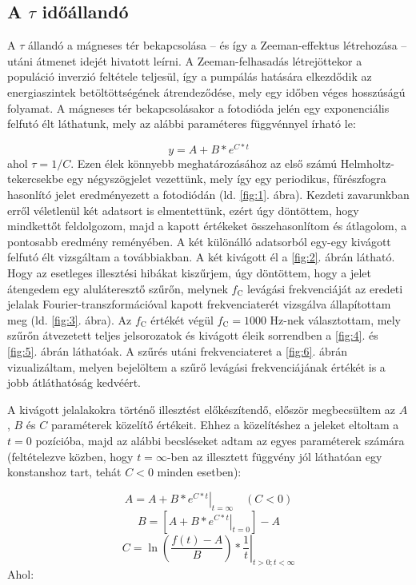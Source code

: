 \begin{multicols}{2}
\subsection{A $\tau$ időállandó}
A $\tau$ állandó a mágneses tér bekapcsolása -- és így a Zeeman-effektus létrehozása -- utáni átmenet idejét hivatott leírni. A Zeeman-felhasadás létrejöttekor a populáció inverzió feltétele teljesül, így a pumpálás hatására elkezdődik az energiaszintek betöltöttségének átrendeződése, mely egy időben véges hosszúságú folyamat. A mágneses tér bekapcsolásakor a fotodióda jelén egy exponenciális felfutó élt láthatunk, mely az alábbi paraméteres függvénnyel írható le:

\begin{equation} \label{eq:2}
y
=
A + B * e^{C * t}
\end{equation}
ahol $\tau = 1/C$. Ezen élek könnyebb meghatározásához az első számú Helmholtz-tekercsekbe egy négyszögjelet vezettünk, mely így egy periodikus, fűrészfogra hasonlító jelet eredményezett a fotodiódán (ld. \ref{fig:1}. ábra). Kezdeti zavarunkban erről véletlenül két adatsort is elmentettünk, ezért úgy döntöttem, hogy mindkettőt feldolgozom, majd a kapott értékeket összehasonlítom és átlagolom, a pontosabb eredmény reményében. \newline
A két különálló adatsorból egy-egy kivágott felfutó élt vizsgáltam a továbbiakban. A két kivágott él a \ref{fig:2}. ábrán látható. Hogy az esetleges illesztési hibákat kiszűrjem, úgy döntöttem, hogy a jelet átengedem egy aluláteresztő szűrőn, melynek $f_{\text{C}}$ levágási frekvenciáját az eredeti jelalak Fourier-transzformációval kapott frekvenciaterét vizsgálva állapítottam meg (ld. \ref{fig:3}. ábra). Az $f_{\text{C}}$ értékét végül $f_{\text{C}} = 1000$ Hz-nek választottam, mely szűrőn átvezetett teljes jelsorozatok és kivágott éleik sorrendben a \ref{fig:4}. és \ref{fig:5}. ábrán láthatóak. A szűrés utáni frekvenciateret a \ref{fig:6}. ábrán vizualizáltam, melyen bejelöltem a szűrő levágási frekvenciájának értékét is a jobb átláthatóság kedvéért. \par
A kivágott jelalakokra történő illesztést előkészítendő, először megbecsültem az $A$, $B$ és $C$ paraméterek közelítő értékeit. Ehhez a közelítéshez a jeleket eltoltam a $t = 0$ pozícióba, majd az alábbi becsléseket adtam az egyes paraméterek számára (feltételezve közben, hogy $t = \infty$-ben az illesztett függvény jól láthatóan egy konstanshoz tart, tehát $C < 0$ minden esetben):

\begin{equation*}
A
=
\left. A + B * e^{C * t} \right|_{t = \infty} \quad (C < 0)
\end{equation*}
\begin{equation*}
B
=
\left[ \left. A + B * e^{C * t} \right|_{t = 0} \right] - A
\end{equation*}
\begin{equation*}
C
=
\left. \ln \left( \frac{f \left( t \right) - A}{B} \right) * \frac{1}{t} \right|_{t > 0; t < \infty}
\end{equation*}
Ahol:


\end{multicols}
